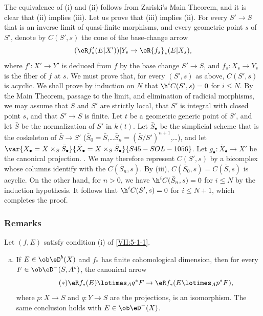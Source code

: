 The equivalence of (i) and (ii) follows from Zariski's Main Theorem, and it is
clear that (ii) implies (iii). Let us prove that (iii) implies (ii). For every
$S'\to S$ that is an inverse limit of quasi-finite morphisms, and every
geometric point $s$ of $S'$, denote by $C(S',s)$ the cone of the base-change
arrow
\[
  (\eR f'_\ast(E|X'))|Y_s \to \eR{f_s}_\ast (E|X_s) \text{,} 
\]
where $f':X'\to Y'$ is deduced from $f$ by the base change $S'\to S$, and
$f_s:X_s\to Y_s$ is the fiber of $f$ at $s$. We must prove that, for every
$(S',s)$ as above, $C(S',s)$ is acyclic. We shall prove by induction on $N$ that
$\h^i C(S',s) = 0$ for $i\leqslant N$. By the Main Theorem, passage to the
limit, and elimination of radicial morphisms, we may assume that $S$ and $S'$
are strictly local, that $S'$ is integral with closed point $s$, and that
$S'\to S$ is finite. Let $t$ be a geometric generic point of $S'$, and let
$\bar S$ be the normalization of $S'$ in $k(t)$. Let $\bar S_\bullet$ be the
simplicial scheme that is the coskeleton of $\bar S\to S'$
($\bar S_0=\bar S$,\ldots $\bar S_n=(\bar S/S')^{n+1}$,\ldots), and let
$\var{X_\bullet=X\times_S \bar S_\bullet}{\bar X_\bullet=X\times_S \bar S_\bullet}{S45-SOL-1056}$. Let
$g_\bullet:\bar X_\bullet \to X'$ be the canonical projection. 
\cite[VIII 8]{sga4}. We may therefore represent $C(S',s)$ by a bicomplex whose
columns identify with the $C(\bar S_n,s)$. By (iii),
$C(\bar S_0,s)=C(\bar S,s)$ is acyclic. On the other hand, for $n>0$, we have
$\h^i C(\bar S_n,s)=0$ for $i\leqslant N$ by the induction hypothesis. It
follows that $\h^i C(S',s)=0$ for $i\leqslant N+1$, which completes the proof.





\subsubsection{Remarks}\label{VII:5-1-2}

Let $(f,E)$ satisfy condition (i) of \ref{VII:5-1-1}.
\begin{enumerate}[a)]
  \item If $E\in \ob \eD^b(X)$ and $f_\ast$ has finite cohomological
    dimension, then for every $F\in \ob\eD^-(S,A^\circ)$, the canonical arrow
    \begin{equation*}\tag{$*$}\label{VII:eq:5-1-1-1}
      \eR f_\ast(E)\lotimes_A q^\ast F \to \eR f_\ast(E\lotimes_A p^\ast F) \text{,} 
    \end{equation*}
    where $p:X\to S$ and $q:Y\to S$ are the projections, is an isomorphism.
    The same conclusion holds with $E\in\ob\eD^-(X)$.
\end{enumerate} 

